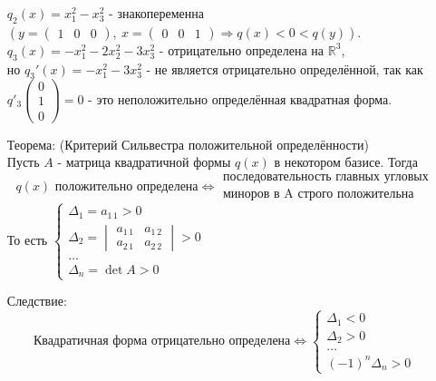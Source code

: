 \documentclass[12pt, letterpaper, twoside]{article}
\begin{document}
\begin{enumerate}
        $q_2(x) = x_1^2 - x_3^2$ - знакопеременна $\left(y = \begin{pmatrix}
            1 & 0 & 0
        \end{pmatrix},\ x =\begin{pmatrix}
            0 & 0 & 1
        \end{pmatrix}\Rightarrow q(x) < 0 < q(y)\right)$.\\
        $q_3(x) = -x^2_1 - 2x_2^2 - 3x_3^2$ - отрицательно определена на $\mathbb{R}^3$,\\
        но $q_3'(x) = -x^2_1 - 3x_3^2$ - не является отрицательно определённой, так как $q'_3\begin{pmatrix}
            0\\
            1\\
            0
        \end{pmatrix} = 0$ - это неположительно определённая квадратная форма.
        \item[Теорема:] (Критерий Сильвестра положительной определённости)\\
        Пусть $A$ - матрица квадратичной формы $q(x)$ в некотором базисе. Тогда
        \[q(x)\text{ положительно определена}\Leftrightarrow \begin{matrix}\text{последовательность главных угловых}\\ \text{миноров в A строго положительна} \end{matrix}\]
        То есть $\begin{cases}
            \Delta_1 = a_{1\, 1} > 0\\
            \Delta_2 = \begin{vmatrix}
                a_{1\, 1} & a_{1\, 2}\\
                a_{2\, 1} & a_{2\, 2}
            \end{vmatrix} > 0\\
            \dots\\
            \Delta_{n} = \det A > 0
        \end{cases}$\\
        \item[Следствие:]
        \[\text{Квадратичная форма отрицательно определена}\Leftrightarrow \begin{cases}
            \Delta_1 < 0\\
            \Delta_2 > 0\\
            \dots\\
            (-1)^n\Delta_n > 0
        \end{cases}\]

\end{enumerate}
\end{document}
